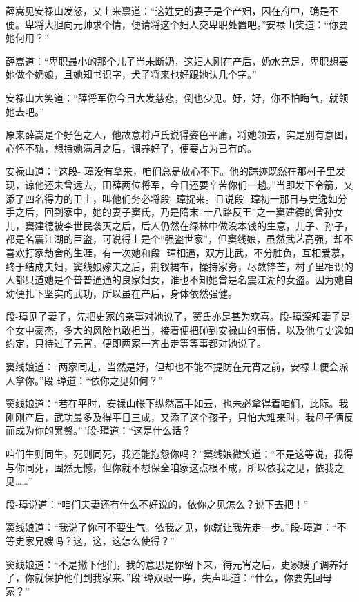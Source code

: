 \documentclass[12pt,oneside]{book}
\begin{document}
薛嵩见安禄山发怒，又上来禀道：``这姓史的妻子是个产妇，囚在府中，确是不便。卑将大胆向元帅求个情，便请将这个妇人交卑职处置吧。''安禄山笑道：``你要她何用？''

薛嵩道：``卑职最小的那个儿子尚未断奶，这妇人刚在产后，奶水充足，卑职想要她做个奶娘，且她知书识字，犬子将来也好跟她认几个字。''

安禄山大笑道：``薛将军你今日大发慈悲，倒也少见。好，好，你不怕晦气，就领她去吧。''

原来薛嵩是个好色之人，他故意将卢氏说得姿色平庸，将她领去，实是别有意图，心怀不轨，想持她满月之后，调养好了，便要占为已有的。

安禄山道：``这段-
璋没有拿来，咱们总是放心不下。他的踪迹既然在那村子里发现，谅他还未曾远去，田薛两位将军，今日还要辛苦你们一趟。''当即发下令箭，又添了四名得力的卫士，叫他们务必将段-
璋捉来。且说段-
璋初一那日与史逸如分手之后，回到家中，她的妻子窦氏，乃是隋末``十八路反王''之一窦建德的曾孙女儿，窦建德被李世民袭灭之后，后人仍然在绿林中做没本钱的生意，儿子、孙子，都是名震江湖的巨盗，可说得上是个``强盗世家''，但窦线娘，虽然武艺高强，却不喜欢打家劫舍的生涯，有一次她和段-
璋相遇，双方比武，不分胜负，互相爱慕，终于结成夫妇，窦线娘嫁夫之后，荆钗裙布，操持家务，尽敛锋芒，村子里相识的人都只道她是个普普通通的良家妇女，谁也不知她曾是名震江湖的女盗。因为她自幼便扎下坚实的武功，所以虽在产后，身体依然强健。

段-璋见了妻子，先把史家的亲事对她说了，窦氏亦是甚为欢喜。段-璋深知妻子是个女中豪杰，多大的风险也敢担当，接着便把碰到安禄山的事情，以及他与史逸如约定，只待过了元宵，便即两家一齐出走等等事都对她说了。

窦线娘道：``两家同走，当然是好，但却也不能不提防在元宵之前，安禄山便会派人拿你。''段-璋道：``依你之见如何？''

窦线娘道：``若在平时，安禄山帐下纵然高手如云，也未必拿得着咱们，此际。我刚刚产后，武功最多及得平日三成，又添了这个孩子，只怕大难来时，我母子俩反而成为你的累赘。''\,'段-璋道：``这是什么话？

咱们生则同生，死则同死，我还能抱怨你吗？''窦线娘微笑道：``不是这等说，我得与你同死，固然无憾，但你就不想保全咱家这点根不成，所以依我之见，依我之见\ldots\ldots{}''

段-璋说道：``咱们夫妻还有什么不好说的，依你之见怎么？说下去把！''

窦线娘道：``我说了你可不要生气。依我之见，你就让我先走一步。''段-璋道：``不等史家兄嫂吗？这，这，这怎么使得？''

窦线娘道：``不是撇下他们，我的意思是你留下来，待元宵之后，史家嫂子调养好了，你就保护他们到我家来、''段-璋双眼一睁，失声叫道：``什么，你要先回母家？''
\end{document}
